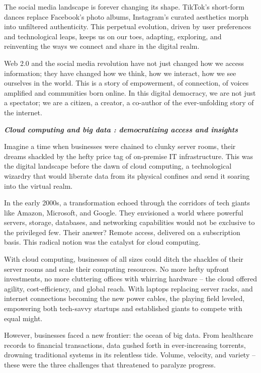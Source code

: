 \documentclass[
  letterpaper,
  DIV=11,
  numbers=noendperiod]{scrreprt}
\begin{document}
The social media landscape is forever changing its shape. TikTok's
short-form dances replace Facebook's photo albums, Instagram's curated
aesthetics morph into unfiltered authenticity. This perpetual evolution,
driven by user preferences and technological leaps, keeps us on our
toes, adapting, exploring, and reinventing the ways we connect and share
in the digital realm.

Web 2.0 and the social media revolution have not just changed how we
access information; they have changed how we think, how we interact, how
we see ourselves in the world. This is a story of empowerment, of
connection, of voices amplified and communities born online. In this
digital democracy, we are not just a spectator; we are a citizen, a
creator, a co-author of the ever-unfolding story of the internet.

\textbf{\emph{Cloud computing and big data : democratizing access and
insights}}

Imagine a time when businesses were chained to clunky server rooms,
their dreams shackled by the hefty price tag of on-premise IT
infrastructure. This was the digital landscape before the dawn of cloud
computing, a technological wizardry that would liberate data from its
physical confines and send it soaring into the virtual realm.

In the early 2000s, a transformation echoed through the corridors of
tech giants like Amazon, Microsoft, and Google. They envisioned a world
where powerful servers, storage, databases, and networking capabilities
would not be exclusive to the privileged few. Their answer? Remote
access, delivered on a subscription basis. This radical notion was the
catalyst for cloud computing.

With cloud computing, businesses of all sizes could ditch the shackles
of their server rooms and scale their computing resources. No more hefty
upfront investments, no more cluttering offices with whirring hardware
-- the cloud offered agility, cost-efficiency, and global reach. With
laptops replacing server racks, and internet connections becoming the
new power cables, the playing field leveled, empowering both tech-savvy
startups and established giants to compete with equal might.

However, businesses faced a new frontier: the ocean of big data. From
healthcare records to financial transactions, data gushed forth in
ever-increasing torrents, drowning traditional systems in its relentless
tide. Volume, velocity, and variety -- these were the three challenges
that threatened to paralyze progress.
\end{document}
